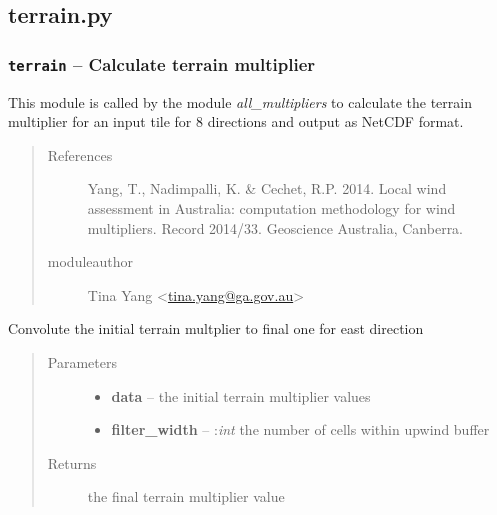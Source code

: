 \documentclass[letterpaper,10pt,english]{sphinxmanual}
\begin{document}
\subsection{terrain.py}
\label{docs/terrain:module-terrain_mult}\label{docs/terrain:terrain-py}

\subsubsection{\texttt{terrain} -- Calculate terrain multiplier}
\label{docs/terrain:terrain-calculate-terrain-multiplier}
This module is called by the module
\emph{all\_multipliers} to calculate the terrain multiplier for an input tile
for 8 directions and output as NetCDF format.
\begin{quote}\begin{description}
\item[{References}] \leavevmode
Yang, T., Nadimpalli, K. \& Cechet, R.P. 2014. Local wind assessment
in Australia: computation methodology for wind multipliers. Record 2014/33.
Geoscience Australia, Canberra.

\item[{moduleauthor}] \leavevmode
Tina Yang \textless{}\href{mailto:tina.yang@ga.gov.au}{tina.yang@ga.gov.au}\textgreater{}

\end{description}\end{quote}


\begin{fulllineitems}
\label{docs/terrain:terrain_mult.convo_e}
Convolute the initial terrain multplier to final one for east direction
\begin{quote}\begin{description}
\item[{Parameters}] \leavevmode\begin{itemize}
\item {} 
\textbf{data} --  the initial terrain multiplier values

\item {} 
\textbf{filter\_width} -- :\emph{int} the number of cells within upwind buffer

\end{itemize}

\item[{Returns}] \leavevmode
{} the final terrain multiplier value

\end{description}\end{quote}

\end{fulllineitems}
\end{document}
